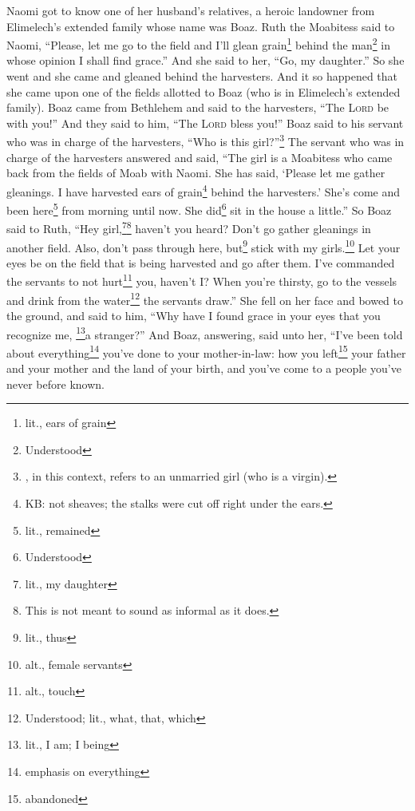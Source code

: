 
\begin{inparaenum}
     Naomi got to know one of her husband's relatives, a heroic landowner from Elimelech's extended family whose name was Boaz.%
     Ruth the Moabitess said to Naomi, ``Please, let me go to the field and I'll glean grain\footnote{lit., ears of grain} behind the man\footnote{Understood} in whose opinion I shall find grace.'' And she said to her, ``Go, my daughter.''%
     So she went and she came and gleaned behind the harvesters. And it so happened that she came upon one of the fields allotted to Boaz (who is in Elimelech's extended family).%
     Boaz came from Bethlehem and said to the harvesters, ``The \textsc{Lord} be with you!'' And they said to him, ``The \textsc{Lord} bless you!''%
     Boaz said to his servant who was in charge of the harvesters, ``Who is this girl?''\footnote{, in this context, refers to an unmarried girl (who is a virgin).}%
     The servant who was in charge of the harvesters answered and said, ``The girl is a Moabitess who came back from the fields of Moab with Naomi.%
     She has said, `Please let me gather gleanings. I have harvested ears of grain\footnote{KB: not sheaves; the stalks were cut off right under the ears.} behind the harvesters.' She's come and been here\footnote{lit., remained} from morning until now. She did\footnote{Understood} sit in the house a little.''%
     So Boaz said to Ruth, ``Hey girl,\footnote{lit., my daughter}\footnote{This is not meant to sound as informal as it does.} haven't you heard? Don't go gather gleanings in another field. Also, don't pass through here, but\footnote{lit., thus} stick with my girls.\footnote{alt., female servants}%
     Let your eyes be on the field that is being harvested and go after them. I've commanded the servants to not hurt\footnote{alt., touch} you, haven't I? When you're thirsty, go to the vessels and drink from the water\footnote{Understood; lit., what, that, which} the servants draw.''%
     She fell on her face and bowed to the ground, and said to him, ``Why have I found grace in your eyes that you recognize me, \footnote{lit., I am; I being}a stranger?''%
     And Boaz, answering, said unto her, ``I've been told about everything\footnote{emphasis on everything} you've done to your mother-in-law: how you left\footnote{abandoned} your father and your mother and the land of your birth, and you've come to a people you've never before known.%

\end{inparaenum}

